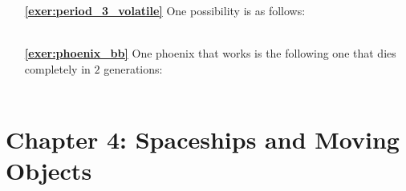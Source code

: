 \begin{multicols}{2}
\begin{itemize}[leftmargin=0em]
		
		\item[\bf\color{ocre}\sffamily\ref{exer:period_3_volatile}] One possibility is as follows: \\[-0.6em]
		
		 \\
		
		
		\item[\bf\color{ocre}\sffamily\ref{exer:phoenix_bb}] One phoenix that works is the following one that dies completely in $2$ generations: \\[-0.6em]
		
		 \\
	\end{itemize}
\end{multicols}


\hypertarget{solutions_spaceships}{}\label{solutions_spaceships}
\section*{Chapter 4: Spaceships and Moving Objects}
\renewcommand{\chapterfolder}{spaceships/}

